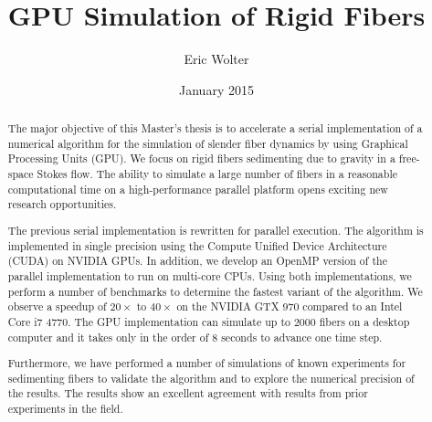 \documentclass[a4paper,11pt]{kth-mag}
\title{GPU Simulation of Rigid Fibers}
\author{Eric Wolter}
\date{January 2015}
\begin{document}
\frontmatter
\pagestyle{empty}

\maketitle
{}
\begin{abstract}
The major objective of this Master's thesis is to accelerate a serial implementation of a numerical algorithm for the simulation of slender fiber dynamics by using Graphical Processing Units (GPU). We focus on rigid fibers sedimenting due to gravity in a free-space Stokes flow. The ability to simulate a large number of fibers in a reasonable computational time on a high-performance parallel platform opens exciting new research opportunities.

The previous serial implementation is rewritten for parallel execution. The algorithm is implemented in single precision using the Compute Unified Device Architecture (CUDA) on NVIDIA GPUs. In addition, we develop an OpenMP version of the parallel implementation to run on multi-core CPUs. Using both implementations, we perform a number of benchmarks to determine the fastest variant of the algorithm. We observe a speedup of $20×$ to $40×$ on the NVIDIA GTX 970 compared to an Intel Core i7 4770. The GPU implementation can simulate up to $2000$ fibers on a desktop computer and it takes only in the order of $8$ seconds to advance one time step.

Furthermore, we have performed a number of simulations of known experiments for sedimenting fibers to validate the algorithm and to explore the numerical precision of the results. The results show an excellent agreement with results from prior experiments in the field.
\end{abstract}
\clearpage
\end{document}
